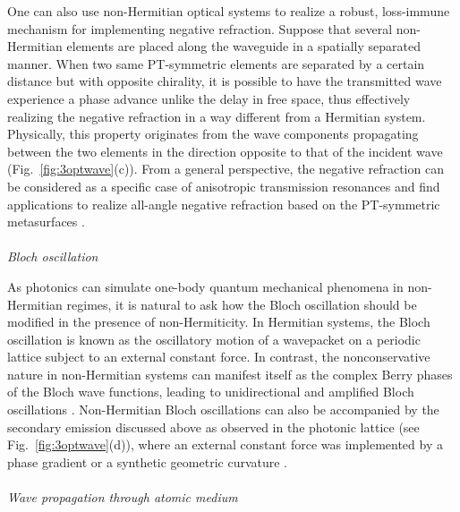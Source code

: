 \documentclass{tADP2e}
\theoremstyle{plain}
\theoremstyle{plain}
\theoremstyle{definition}
\begin{document}
\vspace{3pt}
\noindent 
One can also use non-Hermitian optical systems to realize a robust, loss-immune mechanism for implementing negative refraction.
Suppose that several non-Hermitian elements are placed along the waveguide in a spatially separated manner. When two same PT-symmetric elements are separated by a certain distance but with opposite chirality, it is possible to have the transmitted wave experience a phase advance unlike the  delay in free space, thus effectively realizing the negative refraction \cite{FR14} in a way different from a Hermitian system. Physically, this property originates from the wave components propagating between the two elements in the direction opposite to that of the incident wave (Fig.~\ref{fig:3optwave}(c)). 
From a general perspective, the negative refraction can be considered as a specific case of anisotropic transmission resonances \cite{GL12} and find applications to realize all-angle negative refraction based on the PT-symmetric metasurfaces \cite{MF16}. 
\\
\\
{\it Bloch oscillation}

\vspace{3pt}
\noindent As photonics can simulate one-body quantum mechanical phenomena in non-Hermitian regimes, it is natural to ask how the Bloch oscillation \cite{BF29} should be modified in the presence of non-Hermiticity. In Hermitian systems, the Bloch oscillation is known as the oscillatory motion of a wavepacket on a periodic lattice subject to an external constant force. In contrast, the nonconservative nature in non-Hermitian systems can manifest itself as the complex Berry phases of the Bloch wave functions, leading to unidirectional and amplified Bloch oscillations \cite{LS09}. 
Non-Hermitian Bloch oscillations can also be accompanied by the secondary emission discussed above as observed in the photonic lattice \cite{RA12pt,WM15,XYL16} (see Fig.~\ref{fig:3optwave}(d)), where an external constant force was implemented by a phase gradient \cite{WM15} or a synthetic geometric curvature \cite{XYL16}.
\\
\\
{\it Wave propagation through atomic medium}
\end{document}
